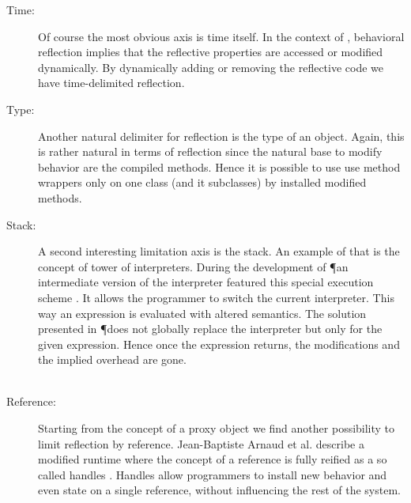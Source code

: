 \begin{description}
\item[Time:] Of course the most obvious axis is time itself.
	In the context of \ST, behavioral reflection implies that the reflective properties are accessed or modified dynamically.
	By dynamically adding or removing the reflective code we have time-delimited reflection.
	
\item[Type:] Another natural delimiter for reflection is the type of an object.
	Again, this is rather natural in terms of \ST reflection since the natural base to modify behavior are the compiled methods.
	Hence it is possible to use use method wrappers only on one class (and it subclasses) by installed modified methods.

\item[Stack:] A second interesting limitation axis is the stack.
	An example of that is the concept of tower of interpreters.
	During the development of \P an intermediate version of the \ST interpreter featured this special execution scheme \cite{Verw10a}.
	It allows the programmer to switch the current interpreter.
	This way an expression is evaluated with altered semantics.
	The solution presented in \P does not globally replace the interpreter but only for the given expression. 
	Hence once the expression returns, the modifications and the implied overhead are gone.
	\\
	\\

\item[Reference:] Starting from the concept of a proxy object we find another possibility to limit reflection by reference.
	Jean-Baptiste Arnaud et al. describe a modified \PH runtime where the concept of a reference is fully reified as a so called handles \cite{Arna13a}.
	Handles allow programmers to install new behavior and even state on a single reference, without influencing the rest of the system.
	
\end{description}
%

\noindet

\\
\\

